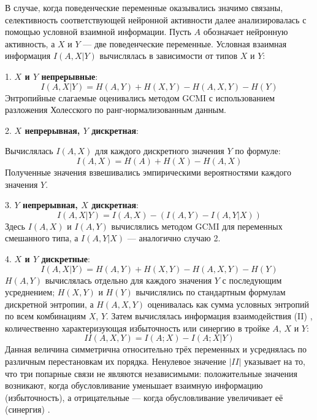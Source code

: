 В случае, когда поведенческие переменные оказывались значимо связаны, селективность соответствующей нейронной активности далее анализировалась с помощью условной взаимной информации.
Пусть $A$ обозначает нейронную активность, а $X$ и $Y$ --- две поведенческие переменные. Условная
взаимная информация $I(A,X|Y)$ вычислялась в зависимости от типов $X$ и $Y$:

1. \textbf{$X$ и $Y$ непрерывные}:
\begin{equation*}
I(A,X|Y) = H(A,Y) + H(X,Y) - H(A,X,Y) - H(Y)
\end{equation*}
Энтропийные слагаемые оценивались методом GCMI с использованием разложения Холесского по ранг-нормализованным данным.

2. \textbf{$X$ непрерывная, $Y$ дискретная}:

Вычислялась $I(A,X)$ для каждого дискретного значения $Y$ по формуле:
\begin{equation*}
I(A,X) = H(A) + H(X) - H(A,X)
\end{equation*}
Полученные значения взвешивались эмпирическими вероятностями каждого значения $Y$.

3. \textbf{$Y$ непрерывная, $X$ дискретная}:
\begin{equation*}
I(A,X|Y) = I(A,X) - (I(A,Y) - I(A,Y|X))
\end{equation*}
Здесь $I(A,X)$ и $I(A,Y)$ вычислялись методом GCMI для переменных смешанного типа, а
$I(A,Y|X)$ --- аналогично случаю 2.

4. \textbf{$X$ и $Y$ дискретные}:
\begin{equation*}
I(A,X|Y) = H(A,Y) + H(X,Y) - H(A,X,Y) - H(Y)
\end{equation*}
$H(A,Y)$ вычислялась отдельно для каждого значения $Y$ с последующим усреднением; $H(X,Y)$ и
$H(Y)$ вычислялись по стандартным формулам дискретной энтропии, а $H(A,X,Y)$
оценивалась как сумма условных энтропий по всем комбинациям $X$, $Y$.
Затем вычислялась информация взаимодействия (II) \cite{McGill1954,ghassami2017},
количественно характеризующая избыточность или синергию в тройке $A$, $X$ и $Y$:
\begin{equation*}
II(A,X,Y) = I(A;X) - I(A;X|Y)
\end{equation*}
Данная величина симметрична относительно трёх переменных и усреднялась
по различным перестановкам их порядка. Ненулевое значение $|II|$ указывает на то, что
три попарные связи не являются независимыми: положительные значения возникают, когда
обусловливание уменьшает взаимную информацию (избыточность), а отрицательные ---
когда обусловливание увеличивает её (синергия) \cite{Bell2003}.

